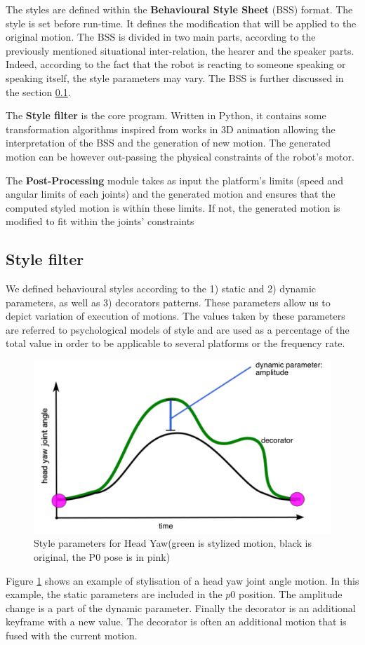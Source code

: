 \documentclass[a4paper,twocolumn]{svjour3}
\begin{document}
The styles are defined within the \textbf{Behavioural Style Sheet} (BSS) format. 
The style is set before run-time. 
It defines the modification that will be applied to the original motion.
The BSS is divided in two main parts, according to the previously mentioned situational inter-relation, the hearer and the speaker parts.
Indeed,  according to the fact that the robot is reacting to someone speaking or speaking itself, the style parameters may vary.
The BSS is further discussed in the section \ref{ssec:bss}.

The \textbf{Style filter} is the core program. 
Written in Python, it contains some transformation algorithms inspired from works in 3D animation allowing the interpretation of the BSS and the generation of new motion.
The generated motion can be however out-passing the physical constraints of the robot's motor. 

The \textbf{Post-Processing} module takes as input the platform's limits (speed and angular limits of each joints) and the generated motion and ensures that the computed styled motion is within these limits.
If not, the generated motion is modified to fit within the joints' constraints


\subsection{Style filter}
\label{ssec:bss}
We defined behavioural styles according to the 1) static and 2) dynamic parameters, as well as 3) decorators patterns. 
These parameters allow us to depict variation of execution of motions.
The values taken by these parameters are referred to psychological models of style and are used as a percentage of the total value in order to be applicable to several platforms or the frequency rate.
\begin{figure}
	\centering
	\includegraphics[width=0.8\linewidth]{Figures/illustrate/style_graph}
	\caption{Style parameters for Head Yaw(green is stylized motion, black is original, the P0 pose is in pink)}
	\label{fig:styles_parameters}
\end{figure}
Figure \ref{fig:styles_parameters} shows an example of stylisation of a head yaw joint angle motion.
In this example, the static parameters are included in the $p0$ position.
The amplitude change is a part of the dynamic parameter. 
Finally the decorator is an additional keyframe with a new value. 
The decorator is often an additional motion that is fused with the current motion.
\end{document}
